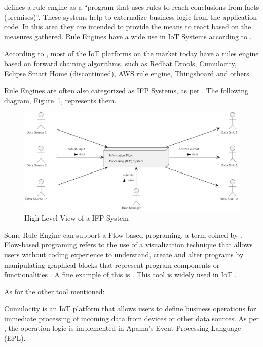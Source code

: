 \cite{CHISHOLM20041} defines a rule engine as a ``program that uses rules to reach conclusions from facts (premises)''. These systems help to externalize business logic from the application code. In this area they are intended to provide the means to react based on the measures gathered. 
Rule Engines have a wide use in \gls{IoT} Systems according to \cite{LUO2021220, Milenkovic2020, 8938723}.

According to \cite{rules-waylay}, most of the IoT platforms on the market today have a rules engine based on forward chaining algorithms, such as Redhat Drools, Cumulocity, Eclipse Smart Home (discontinued), AWS rule engine, Thingsboard and others.

Rule Engines are often also categorized as \gls{IFP} Systems, as per \cite{cugola2012processing}.
The following diagram, Figure~\ref{fig:stateofart:arch:infra:rule:ifp}, represents them.

\begin{figure}[H]
   \centering
   \includegraphics[page=1,width=\columnwidth]{assets/diagrams/design/domain/ifp-system.pdf}
   \caption[High-Level View of a \gls{IFP} System]{High-Level View of a \gls{IFP} System}
   \label{fig:stateofart:arch:infra:rule:ifp}
\end{figure}

Some Rule Engine can support a Flow-based programing, a term coined by \cite{morrison1994flow}. Flow-based programing refers to the use of a visualization technique that allows users without coding experience to understand, create and alter programs by manipulating graphical blocks that represent program
components or functionalities \parencite{morrison2010flow}. A fine example of this is . This tool is widely used in \gls{IoT} \parencite{10.1145/3448891.3448938}.

As for the other tool mentioned:

Cumulocity is an \gls{IoT} platform that allows users to define business operations for immediate processing of incoming data from devices or other data sources. As per \cite{cumulocity}, the operation logic is implemented in Apama's Event Processing Language (EPL).

